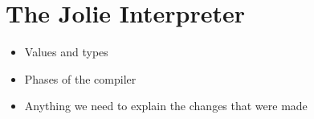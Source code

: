 
\section{The Jolie Interpreter}

\begin{itemize}
\item Values and types
\item Phases of the compiler
\item Anything we need to explain the changes that were made
\end{itemize}

